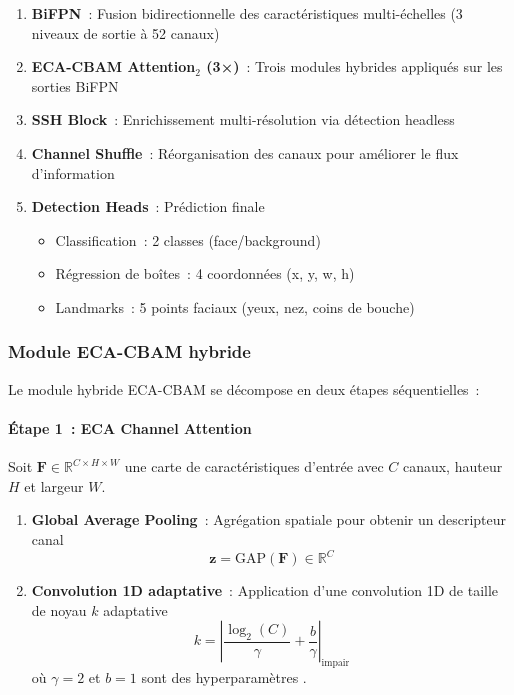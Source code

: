 \begin{onehalfspace}
\begin{enumerate}
\item \textbf{BiFPN}~: Fusion bidirectionnelle des caractéristiques multi-échelles (3 niveaux de sortie à 52 canaux)

\item \textbf{ECA-CBAM Attention$_2$ (3×)}~: Trois modules hybrides appliqués sur les sorties BiFPN

\item \textbf{SSH Block}~: Enrichissement multi-résolution via détection headless

\item \textbf{Channel Shuffle}~: Réorganisation des canaux pour améliorer le flux d'information

\item \textbf{Detection Heads}~: Prédiction finale
   \begin{itemize}
   \item Classification~: 2 classes (face/background)
   \item Régression de boîtes~: 4 coordonnées (x, y, w, h)
   \item Landmarks~: 5 points faciaux (yeux, nez, coins de bouche)
   \end{itemize}
\end{enumerate}

\subsubsection{Module ECA-CBAM hybride}

\hspace{0.65 cm}Le module hybride ECA-CBAM se décompose en deux étapes séquentielles~:

\paragraph{Étape 1~: ECA Channel Attention}

\hspace{0.65 cm}Soit $\mathbf{F} \in \mathbb{R}^{C \times H \times W}$ une carte de caractéristiques d'entrée avec $C$ canaux, hauteur $H$ et largeur $W$.

\begin{enumerate}
\item \textbf{Global Average Pooling}~: Agrégation spatiale pour obtenir un descripteur canal
   \[
   \mathbf{z} = \text{GAP}(\mathbf{F}) \in \mathbb{R}^{C}
   \]

\item \textbf{Convolution 1D adaptative}~: Application d'une convolution 1D de taille de noyau $k$ adaptative
   \[
   k = \left| \frac{\log_2(C)}{\gamma} + \frac{b}{\gamma} \right|_{\text{impair}}
   \]
   où $\gamma = 2$ et $b = 1$ sont des hyperparamètres \cite{Wang2020ECANet}.


\end{enumerate}
\end{onehalfspace}
